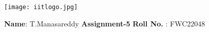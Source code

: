 \documentclass[10pt,a4paper]{report}
\begin{document}
\begin{figure*}[!tbp]
  \centering
  \begin{minipage}[b]{0.4\textwidth}
    \texttt{[image: iitlogo.jpg]}
  \end{minipage}
  \hfill
  \vspace{5mm}\begin{minipage}[b]{0.4\textwidth}

  \end{minipage}\vspace{0.2cm}
\end{figure*}
\raggedright \textbf{Name}:\hspace{1mm} T.Manasareddy \hspace{3cm} \Large \textbf{Assignment-5}\hspace{2.5cm} %
\normalsize \textbf{Roll No.} :\hspace{1mm} FWC22048\vspace{1cm}
\end{document}
